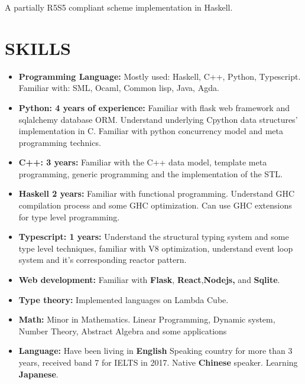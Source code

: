 \documentclass{res}
\begin{document}
\begin{resume}
\begin{tabbing}
    \end{tabbing}\vspace{-30pt}
    A partially R5S5 compliant scheme implementation in Haskell.


\section{SKILLS}
    \begin{itemize}[leftmargin=-.2in]
        \setlength\itemsep{-1em}
        \item \textbf{Programming Language:} Mostly used: Haskell, C++, Python, Typescript. Familiar with: SML, Ocaml, Common lisp, Java, Agda. \\
        \item \textbf{Python: 4 years of experience:}
          Familiar with flask web framework and sqlalchemy database ORM.
          Understand underlying Cpython data structures' implementation in C.
          Familiar with python concurrency model and meta programming technics. \\
        \item \textbf{C++: 3 years:}
          Familiar with the C++ data model, template meta programming,
          generic programming and the implementation of the STL. \\
        \item \textbf{Haskell 2 years:}
          Familiar with functional programming.
          Understand GHC compilation process and some GHC optimization.
          Can use GHC extensions for type level programming.\\
        \item \textbf{Typescript: 1 years:} Understand the structural typing system and some type level techniques, familiar with V8 optimization, understand event loop system and it's corresponding reactor pattern. \\
        \item \textbf{Web development:} Familiar with \textbf{Flask}, \textbf{React},\textbf{Nodejs,} and \textbf{Sqlite}. \\
        \item \textbf{Type theory:} Implemented languages on Lambda Cube. \\
        \item \textbf{Math:} Minor in Mathematics. Linear Programming, Dynamic system, Number Theory, Abstract Algebra and some applications \\
        \item \textbf{Language:} Have been living in \textbf{English} Speaking country for more than 3 years, received band 7 for IELTS in 2017. Native \textbf{Chinese} speaker. Learning \textbf{Japanese}.
    \end{itemize}

\end{resume}
\end{document}
